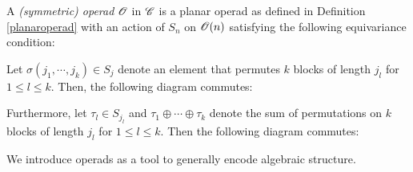     \begin{defin}\label{operad} A {\em (symmetric) operad} $\mathscr{O}$ in $\mathscr{C}$ is a
        planar operad as defined in Definition \ref{planaroperad} with an action
        of $S_n$ on $\mathscr{O}(n)$ satisfying the following equivariance condition:

        Let $\sigma(j_1, \cdots, j_k) \in S_j$ denote an element that permutes
        $k$ blocks of length $j_l$ for $1 \leq l \leq k$. Then, the following
        diagram commutes:
                \begin{center}
                \end{center}      

            Furthermore, let $\tau_l \in S_{j_l}$ and $\tau_1 \oplus \cdots
            \oplus \tau_k$ denote the sum of permutations on $k$ blocks of
            length $j_l$ for $1 \leq l \leq k$. Then the following diagram
            commutes:
                
                \begin{center}
                \end{center}
    \end{defin}

    We introduce operads as a tool to generally encode algebraic structure.
        
